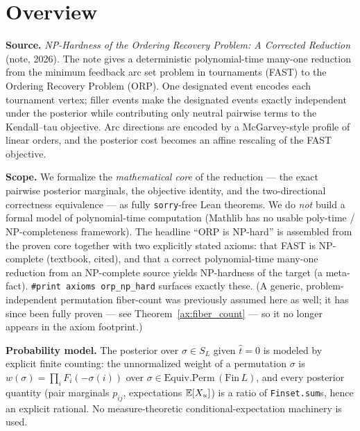 %
%

\chapter*{Overview}

\textbf{Source.} \emph{NP-Hardness of the Ordering Recovery Problem: A Corrected
Reduction} (note, 2026). The note gives a deterministic polynomial-time
many-one reduction from the minimum feedback arc set problem in tournaments
(FAST) to the Ordering Recovery Problem (ORP). One designated event encodes each
tournament vertex; filler events make the designated events exactly independent
under the posterior while contributing only neutral pairwise terms to the
Kendall--tau objective. Arc directions are encoded by a McGarvey-style profile
of linear orders, and the posterior cost becomes an affine rescaling of the FAST
objective.

\textbf{Scope.} We formalize the \emph{mathematical core} of the reduction --- the
exact pairwise posterior marginals, the objective identity, and the
two-directional correctness equivalence --- as fully \texttt{sorry}-free Lean
theorems. We do \emph{not} build a formal model of polynomial-time computation
(Mathlib has no usable poly-time / NP-completeness framework). The headline
``ORP is NP-hard'' is assembled from the proven core together with two
explicitly stated axioms: that FAST is NP-complete (textbook, cited), and that a
correct polynomial-time many-one reduction from an NP-complete source yields
NP-hardness of the target (a meta-fact). \texttt{\#print axioms orp\_np\_hard}
surfaces exactly these. (A generic, problem-independent permutation fiber-count
was previously assumed here as well; it has since been fully proven --- see
Theorem~\ref{ax:fiber_count} --- so it no longer appears in the axiom footprint.)

\textbf{Probability model.} The posterior over $\sigma \in S_L$ given
$\hat t = 0$ is modeled by explicit finite counting: the unnormalized weight of a
permutation $\sigma$ is $w(\sigma) = \prod_i F_i(-\sigma(i))$ over
$\sigma \in \mathrm{Equiv.Perm}\,(\mathrm{Fin}\,L)$, and every posterior quantity
(pair marginals $p_{ij}$, expectations $\mathbb{E}[X_u]$) is a ratio of
\texttt{Finset.sum}s, hence an explicit rational. No measure-theoretic
conditional-expectation machinery is used.

